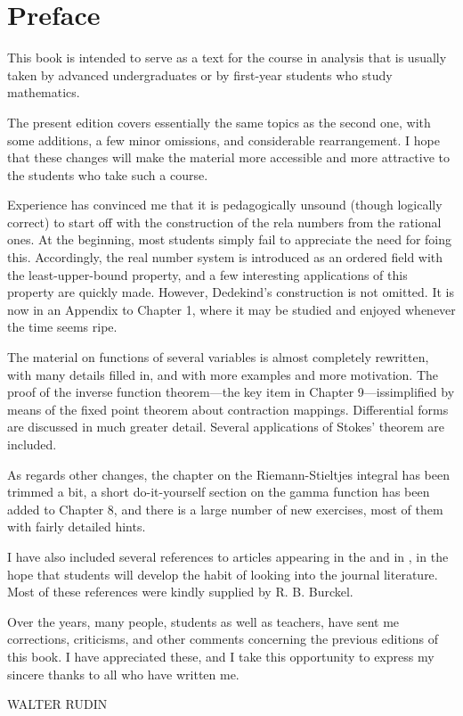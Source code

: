 \setcounter{chapter}{0}
\renewcommand{\thechapter}{0}
\chapter*{Preface}\label{ch:P}
\setcounter{equation}{0}	        %

This book is intended to serve as a text for the course in analysis that is usually taken by advanced undergraduates or by first-year students who study mathematics. 

The present edition covers essentially the same topics as the second one, with some additions, a few minor omissions, and considerable rearrangement. I hope that these changes will make the material more accessible and more attractive to the students who take such a course. 

Experience has convinced me that it is pedagogically unsound (though logically correct) to start off with the construction of the rela numbers from the rational ones. At the beginning, most students simply fail to appreciate the need for foing this. Accordingly, the real number system is introduced as an ordered field with the least-upper-bound property, and a few interesting applications of this property are quickly made. However, Dedekind's construction is not omitted. It is now in an Appendix to Chapter 1, where it may be studied and enjoyed whenever the time seems ripe. 

The material on functions of several variables is almost completely rewritten, with many details filled in, and with more examples and more motivation. The proof of the inverse function theorem---the key item in Chapter 9---issimplified by means of the fixed point theorem about contraction mappings. Differential forms are discussed in much greater detail. Several applications of Stokes' theorem are included. 

As regards other changes, the chapter on the Riemann-Stieltjes integral has been trimmed a bit, a short do-it-yourself section on the gamma function has been added to Chapter 8, and there is a large number of new exercises, most of them with fairly detailed hints. 

I have also included several references to articles appearing in the  and in , in the hope that students will develop the habit of looking into the journal literature. Most of these references were kindly supplied by R. B. Burckel.

Over the years, many people, students as well as teachers, have sent me corrections, criticisms, and other comments concerning the previous editions of this book. I have appreciated these, and I take this opportunity to express my sincere thanks to all who have written me. 

\begin{flushright}
WALTER RUDIN
\end{flushright} 

